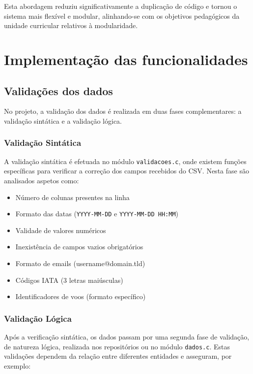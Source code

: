 \documentclass[a4paper,12pt]{scrreprt}
\begin{document}
Esta abordagem reduziu significativamente a duplicação de código e tornou o sistema mais flexível e modular, alinhando-se com os objetivos pedagógicos da unidade curricular relativos à modularidade.


\chapter{Implementação das funcionalidades}

\section{Validações dos dados}

No projeto, a validação dos dados é realizada em duas fases complementares: a validação sintática e a validação lógica.

\subsection{Validação Sintática}

A validação sintática é efetuada no módulo \texttt{validacoes.c}, onde existem funções específicas para verificar a correção dos campos recebidos do CSV. Nesta fase são analisados aspetos como:

\begin{itemize}
    \item Número de colunas presentes na linha
    \item Formato das datas (\texttt{YYYY-MM-DD} e \texttt{YYYY-MM-DD HH:MM})
    \item Validade de valores numéricos
    \item Inexistência de campos vazios obrigatórios
    \item Formato de emails (username@domain.tld)
    \item Códigos IATA (3 letras maiúsculas)
    \item Identificadores de voos (formato específico)
\end{itemize}

\subsection{Validação Lógica}

Após a verificação sintática, os dados passam por uma segunda fase de validação, de natureza lógica, realizada nos repositórios ou no módulo \texttt{dados.c}. Estas validações dependem da relação entre diferentes entidades e asseguram, por exemplo:
\end{document}
